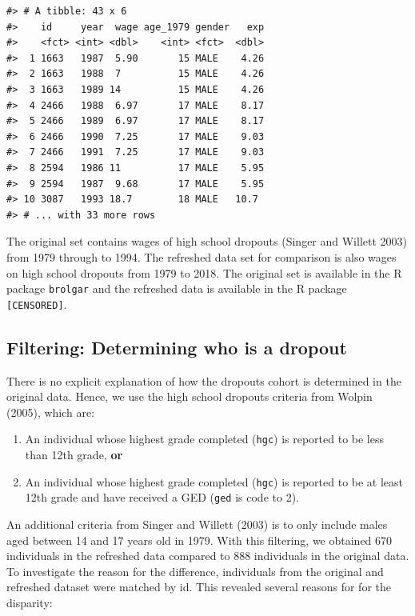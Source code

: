 \documentclass{article}
\providecommand{\tightlist}{%
  \setlength{\itemsep}{0pt}\setlength{\parskip}{0pt}}
\begin{document}
\begin{verbatim}
#> # A tibble: 43 x 6
#>    id     year  wage age_1979 gender   exp
#>    <fct> <int> <dbl>    <int> <fct>  <dbl>
#>  1 1663   1987  5.90       15 MALE    4.26
#>  2 1663   1988  7          15 MALE    4.26
#>  3 1663   1989 14          15 MALE    4.26
#>  4 2466   1988  6.97       17 MALE    8.17
#>  5 2466   1989  6.97       17 MALE    8.17
#>  6 2466   1990  7.25       17 MALE    9.03
#>  7 2466   1991  7.25       17 MALE    9.03
#>  8 2594   1986 11          17 MALE    5.95
#>  9 2594   1987  9.68       17 MALE    5.95
#> 10 3087   1993 18.7        18 MALE   10.7 
#> # ... with 33 more rows
\end{verbatim}

The original set contains wages of high school dropouts (Singer and Willett 2003) from 1979 through to 1994. The refreshed data set for comparison is also wages on high school dropouts from 1979 to 2018. The original set is available in the R package \texttt{brolgar} and the refreshed data is available in the R package \texttt{[CENSORED]}.

\hypertarget{filtering-determining-who-is-a-dropout}{%
\subsection{Filtering: Determining who is a dropout}\label{filtering-determining-who-is-a-dropout}}

There is no explicit explanation of how the dropouts cohort is determined in the original data. Hence, we use the high school dropouts criteria from Wolpin (2005), which are:

\begin{enumerate}
\def\labelenumi{\arabic{enumi}.}
\tightlist
\item
  An individual whose highest grade completed (\texttt{hgc}) is reported to be less than 12th grade, \textbf{or}
\item
  An individual whose highest grade completed (\texttt{hgc}) is reported to be at least 12th grade and have received a GED (\texttt{ged} is code to 2).
\end{enumerate}

An additional criteria from Singer and Willett (2003) is to only include males aged between 14 and 17 years old in 1979. With this filtering, we obtained 670 individuals in the refreshed data compared to 888 individuals in the original data. To investigate the reason for the difference, individuals from the original and refreshed dataset were matched by id. This revealed several reasons for for the disparity:
\end{document}
